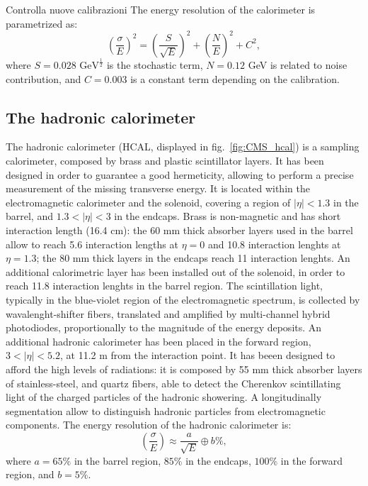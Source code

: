 {\color{red} Controlla nuove calibrazioni} \noindent The energy resolution of the calorimeter is parametrized as:
\begin{equation}
{\left( \frac{\sigma}{E} \right)}^2 = {\left( \frac{S}{\sqrt{E}} \right)}^2 + {\left( \frac{N}{E} \right)}^2 + C^2,
\end{equation}
where $S=0.028 \text{ GeV}^{\frac{1}{2}}$ is the stochastic term, $N=0.12$ GeV is related to noise contribution, and $C=0.003$ is a constant term depending on the calibration.


\subsection{The hadronic calorimeter}
The hadronic calorimeter (HCAL, displayed in fig.~\ref{fig:CMS_hcal}) is a sampling calorimeter, composed by brass and plastic scintillator layers. It has been designed in order to guarantee a good hermeticity, allowing to perform a precise measurement of the missing transverse energy. It is located within the electromagnetic calorimeter and the solenoid, covering a region of $|\eta|<1.3$ in the barrel, and $1.3<|\eta|<3$ in the endcaps. Brass is non-magnetic and has short interaction length (16.4 cm): the 60 mm thick absorber layers used in the barrel allow to reach 5.6 interaction lengths at $\eta=0$ and 10.8 interaction lenghts at $\eta = 1.3$; the 80 mm thick layers in the endcaps reach 11 interaction lenghts. An additional calorimetric layer has been installed out of the solenoid, in order to reach 11.8 interaction lenghts in the barrel region. The scintillation light, typically in the blue-violet region of the electromagnetic spectrum, is collected by wavalenght-shifter fibers, translated and amplified by multi-channel hybrid photodiodes, proportionally to the magnitude of the energy deposits. An additional hadronic calorimeter has been placed in the forward region, $3 < |\eta| < 5.2$, at 11.2 m from the interaction point. It has beeen designed to afford the high levels of radiations: it is composed by 55 mm thick absorber layers of stainless-steel, and quartz fibers, able to detect the Cherenkov scintillating light of the charged particles of the hadronic showering. A longitudinally segmentation allow to distinguish hadronic particles from electromagnetic components.
The energy resolution of the hadronic calorimeter is:
\begin{equation}
\left( \frac{\sigma}{E} \right) \approx \frac{a}{\sqrt{E}} \oplus b\%,
\end{equation}
where $a=65\%$ in the barrel region, $85\%$ in the endcaps, $100\%$ in the forward region, and $b=5\%$.

